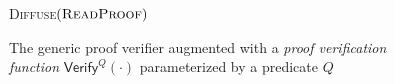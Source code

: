 \begin{figure}[t]
\begin{algorithm}[H]
    \caption{\label{alg.generic-verifier} The generic proof verifier augmented
        with a{ \em proof verification function} $\textsf{Verify}^Q(\cdot)$
        parameterized by a predicate $Q$}
    \begin{algorithmic}[1]
        \If{$\Pi \neq \emptyset$}
        \EndIf
            \State\textsc{Diffuse}{$(\textsc{ReadProof})$}
        \EndIf
        \vskip2pt
    \end{algorithmic}
\end{algorithm}
\end{figure}
